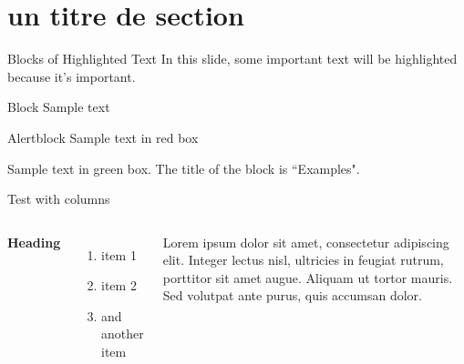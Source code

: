 \documentclass[aspectratio=169,xcolor=dvipsnames, t]{beamer}
\begin{document}
\section{un titre de section}
\begin{frame}{Blocks of Highlighted Text}
    In this slide, some important text will be \alert{highlighted} because it's important.

    \begin{block}{Block}
        Sample text
    \end{block}

    \begin{alertblock}{Alertblock}
        Sample text in red box
    \end{alertblock}

    \begin{examples}
        Sample text in green box. The title of the block is ``Examples".
    \end{examples}
\end{frame}

\begin{frame}[t]{Test with columns }
    \begin{columns}[c]

        \textbf{Heading}
        \begin{enumerate}
            \item item 1 
            \item item 2
            \item and another item
        \end{enumerate}

        Lorem ipsum dolor sit amet, consectetur adipiscing elit. Integer lectus nisl, ultricies in feugiat rutrum, porttitor sit amet augue. Aliquam ut tortor mauris. Sed volutpat ante purus, quis accumsan dolor.

    \end{columns}
\end{frame}
\end{document}

